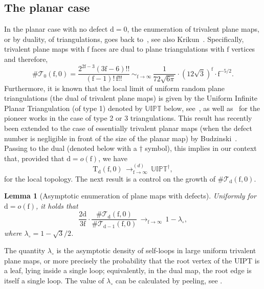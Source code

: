 \documentclass[10pt]{amsart}
\theoremstyle{plain}
\newtheorem{lemma}[theorem]{Lemma}
\theoremstyle{definition}
\theoremstyle{remark}
\newcommand{\Triv}{\mathrm{T}}
\newcommand{\face}{\mathrm{f}}
\newcommand{\defect}{\mathrm{d}}
\newcommand{\cv}[1][n]{\,\mathop{\longrightarrow}^{}_{#1 \to \infty}\,}
\newcommand{\cvloi}[1][n]{\,\mathop{\longrightarrow}^{(d)}_{#1 \to \infty}\,}
\newcommand{\equi}[1][n]{\,\mathop{\sim}^{}_{#1 \to \infty}\,}
\begin{document}
\subsection{The planar case}
\label{ssec:defaut_planar}

In the planar case with no defect $\defect=0$, the enumeration of trivalent plane maps, or by duality, of triangulations, goes back to~\cite{MNS70}, see also Krikun~\cite{Kri07}.
Specifically, trivalent plane maps with $\face$ faces are dual to plane triangulations with $\face$ vertices and therefore,
\begin{equation}\label{eq:triangulations}
\#\mathcal{T}_0(\face,0)
= \frac{2^{2\face-3} (3\face-6)!!}{(\face-1)! \, \face!!}
\equi[\face] \frac{1}{72 \sqrt{6\pi}} \cdot (12\sqrt{3})^\face \cdot \face^{-5/2}.
\end{equation}
Furthermore, it is known that the local limit of uniform random plane triangulations (the dual of trivalent plane maps) is given by the Uniform Infinite Planar Triangulation (of type 1) denoted by $\mathbb{UIPT}$ below, see~\cite[Th.\,6.1]{Ste18}, as well as~\cite{AS03} for the pioneer works in the case of type 2 or 3 triangulations. This result has recently been extended to the case of essentially trivalent planar maps (\ie when the defect number is negligible in front of the size of the planar map) by Budzinski~\cite[Cor.\,2]{Bud21}. Passing to the dual (denoted below with a $\dagger$ symbol), this implies in our context that, provided that $ \defect = o(\face)$, we have
\begin{equation} \label{eq:convUIPT}
\Triv_{ \defect}(\face, 0) \cvloi[\face] \mathbb{UIPT}^\dagger,
\end{equation}
for the local topology.
The next result is a control on the growth of $\#\mathcal{T}_ \defect(\face,0)$.

\begin{lemma}[Asymptotic enumeration of plane maps with defects]
\label{lem:ratio_defauts}
Uniformly for $\defect = o(\face)$, it holds that
\[
\frac{2 \defect}{3 \face} \cdot \frac{\#\mathcal{T}_{\defect}(\face, 0)}{\#\mathcal{T}_{\defect-1}(\face,0)} \cv[\face] 1-\lambda_{\circ},
\]
where $\lambda_{\circ} = 1 - \sqrt{3}/2$.\end{lemma}

The quantity $\lambda_{\circ}$ is the asymptotic density of self-loops in large uniform trivalent plane maps, or more precisely the probability that the root vertex of the UIPT is a leaf, lying inside a single loop; equivalently, in the dual map, the root edge is itself a single loop. The value of $\lambda_{\circ}$ can be calculated by peeling, see \eg \cite[\S 2]{CLG19}.
\end{document}
